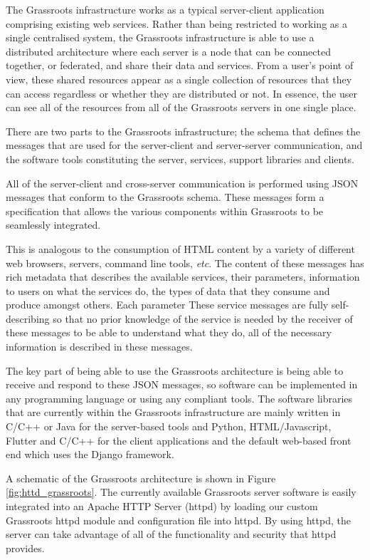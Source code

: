 \documentclass[12pt,a4paper]{extarticle}
\begin{document}
The Grassroots infrastructure works as a typical server-client application comprising existing web services. 
Rather than being restricted to working as a single centralised system, the Grassroots infrastructure is able to use a distributed architecture where each server is a node that can be connected together, or federated, and share their data and services. 
From a user's point of view, these shared resources appear as a single collection of resources that they can access regardless or whether they are distributed or not. In essence, the user can see all of the resources from all of the Grassroots servers in one single place.

There are two parts to the Grassroots infrastructure; the schema that defines the messages that are used for the server-client and server-server communication, and the software tools constituting the server, services, support libraries and clients.

All of the server-client and cross-server communication is performed using JSON\cite{JSON} messages that conform to the Grassroots schema. 
These messages form a specification that allows the various components within Grassroots to be seamlessly integrated. 

This is analogous to the consumption of HTML content by a variety of different web browsers, servers, command line tools, \textit{etc}. 
The content of these messages has rich metadata that describes the available services, their parameters, information to users on what the services do, the types of data that they consume and produce amongst others. 
Each parameter
These service messages are fully self-describing so that no prior knowledge of the service is needed by the receiver of these messages to be able to understand what they do, all of the necessary information is described in these messages. 

The key part of being able to use the Grassroots architecture is being able to receive and respond to these JSON messages, so software can be implemented in any programming language or using any compliant tools.
The software libraries that are currently within the Grassroots infrastructure are mainly written in C/C++ or Java for the server-based tools and Python, HTML/Javascript, Flutter and C/C++ for the client applications and the default web-based front end which uses the Django framework.

A schematic of the Grassroots architecture is shown in Figure \ref{fig:httd_grassroots}. The currently available Grassroots server software is easily integrated into an Apache HTTP Server (httpd)\cite{httpd} by loading our custom Grassroots httpd module and configuration file into httpd. By using httpd, the server can take advantage of all of the functionality and security that httpd provides.  
\end{document}
